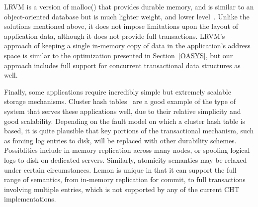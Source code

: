 \documentclass[10pt,letterpaper,twocolumn,english]{article}
\newcommand{\yad}{Lemon\xspace}
\begin{document}
LRVM is a version of malloc() that provides
durable memory, and is similar to an object-oriented database
but is much lighter weight, and lower level~\cite{lrvm}.  Unlike 
the solutions mentioned above, it does not impose limitations upon 
the layout of application data, although it does not provide full transactions.
LRVM's
approach of keeping a single in-memory copy of data in the application's
address space is similar to the optimization presented in
Section~\ref{OASYS}, but our approach includes full support for 
concurrent transactional data structures as well.




Finally, some applications require incredibly simple but extremely
scalable storage mechanisms.  Cluster hash tables~\cite{cht} are a
good example of the type of system that serves these applications
well, due to their relative simplicity and good scalability.
Depending on the fault model on which a cluster hash table is based,
it is quite plausible that key portions of the transactional
mechanism, such as forcing log entries to disk, will be replaced with
other durability schemes.  Possiblities include in-memory replication
across many nodes, or spooling logical logs to disk on dedicated
servers.  Similarly, atomicity semantics may be relaxed under certain
circumstances.  \yad is unique in that it can support the full range
of semantics, from in-memory replication for commit, to full
transactions involving multiple entries, which is not supported by any
of the current CHT implementations.
\end{document}
